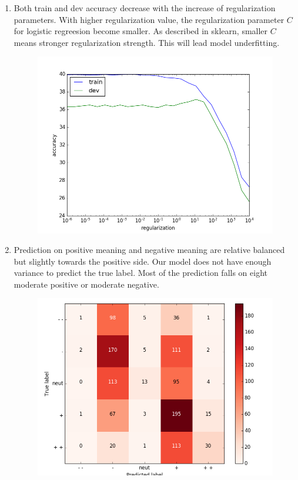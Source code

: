 \documentclass[10pt]{article}
\begin{document}
\begin{enumerate}[label=(\alph*)]
\item
Both train and dev accuracy decrease with the increase of regularization parameters.
With higher regularization value, the regularization parameter $C$ for logistic regreesion become smaller.
As described in sklearn, smaller $C$ means stronger regularization strength. This will lead model underfitting.

\begin{figure}[h]
\center
\includegraphics[scale=0.5]{q4_reg_v_acc.png}
\end{figure}

\item
Prediction on positive meaning and negative meaning are relative balanced but slightly towards the positive side.
Our model does not have enough variance to predict the true label.
Most of the prediction falls on eight moderate positive or moderate negative.
\begin{figure}[h]
\center
\includegraphics[scale=0.5]{q4_dev_conf.png}
\end{figure}



\end{enumerate}
\end{document}
